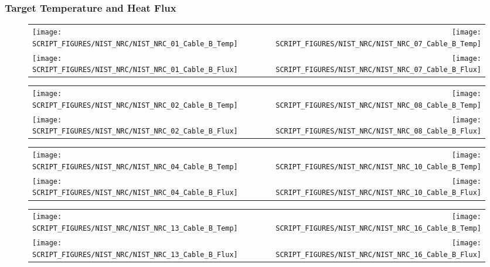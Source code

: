 \clearpage

\subsubsection{Target Temperature and Heat Flux}

\begin{figure}[!ht]
\begin{tabular*}{\textwidth}{l@{\extracolsep{\fill}}r}
\texttt{[image: SCRIPT\_FIGURES/NIST\_NRC/NIST\_NRC\_01\_Cable\_B\_Temp]} &
\texttt{[image: SCRIPT\_FIGURES/NIST\_NRC/NIST\_NRC\_07\_Cable\_B\_Temp]} \\
\texttt{[image: SCRIPT\_FIGURES/NIST\_NRC/NIST\_NRC\_01\_Cable\_B\_Flux]} &
\texttt{[image: SCRIPT\_FIGURES/NIST\_NRC/NIST\_NRC\_07\_Cable\_B\_Flux]}
\end{tabular*}
\label{NIST_NRC_B_1_and_7}
\end{figure}

\begin{figure}[!ht]
\begin{tabular*}{\textwidth}{l@{\extracolsep{\fill}}r}
\texttt{[image: SCRIPT\_FIGURES/NIST\_NRC/NIST\_NRC\_02\_Cable\_B\_Temp]} &
\texttt{[image: SCRIPT\_FIGURES/NIST\_NRC/NIST\_NRC\_08\_Cable\_B\_Temp]} \\
\texttt{[image: SCRIPT\_FIGURES/NIST\_NRC/NIST\_NRC\_02\_Cable\_B\_Flux]} &
\texttt{[image: SCRIPT\_FIGURES/NIST\_NRC/NIST\_NRC\_08\_Cable\_B\_Flux]}
\end{tabular*}
\label{NIST_NRC_B_2_and_8}
\end{figure}

\clearpage

\begin{figure}[!ht]
\begin{tabular*}{\textwidth}{l@{\extracolsep{\fill}}r}
\texttt{[image: SCRIPT\_FIGURES/NIST\_NRC/NIST\_NRC\_04\_Cable\_B\_Temp]} &
\texttt{[image: SCRIPT\_FIGURES/NIST\_NRC/NIST\_NRC\_10\_Cable\_B\_Temp]} \\
\texttt{[image: SCRIPT\_FIGURES/NIST\_NRC/NIST\_NRC\_04\_Cable\_B\_Flux]} &
\texttt{[image: SCRIPT\_FIGURES/NIST\_NRC/NIST\_NRC\_10\_Cable\_B\_Flux]}
\end{tabular*}
\label{NIST_NRC_B_4_and_10}
\end{figure}

\begin{figure}[!ht]
\begin{tabular*}{\textwidth}{l@{\extracolsep{\fill}}r}
\texttt{[image: SCRIPT\_FIGURES/NIST\_NRC/NIST\_NRC\_13\_Cable\_B\_Temp]} &
\texttt{[image: SCRIPT\_FIGURES/NIST\_NRC/NIST\_NRC\_16\_Cable\_B\_Temp]} \\
\texttt{[image: SCRIPT\_FIGURES/NIST\_NRC/NIST\_NRC\_13\_Cable\_B\_Flux]} &
\texttt{[image: SCRIPT\_FIGURES/NIST\_NRC/NIST\_NRC\_16\_Cable\_B\_Flux]}
\end{tabular*}
\label{NIST_NRC_B_13_and_16}
\end{figure}

